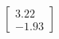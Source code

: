 \documentclass[preview]{standalone}
\begin{document}
\begin{align*}
\begin{bmatrix} 3.22 \\ -1.93 \end{bmatrix}
\end{align*}
\end{document}
